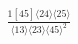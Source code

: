 \documentclass[varwidth, border=5pt]{standalone}
\begin{document}
\begin{my}
$\begin{gathered}
\scriptscriptstyle\frac{1[45]⟨24⟩⟨25⟩}{⟨13⟩⟨23⟩⟨45⟩^2}
\end{gathered}$
\end{my}
\end{document}
